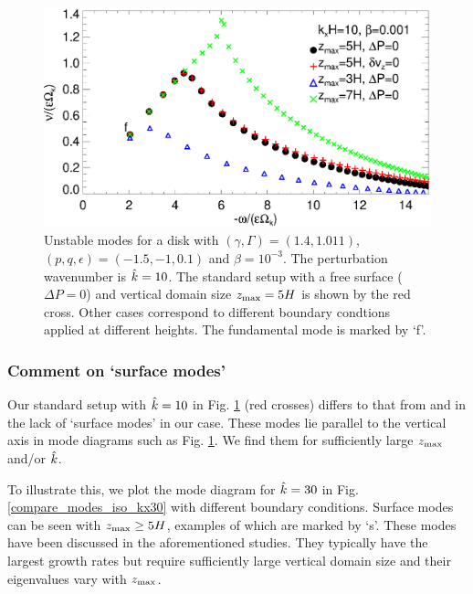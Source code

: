 \begin{figure}
  \includegraphics[width=\linewidth]{figures/compare_modes_iso_kx10.ps}
  \caption{Unstable modes for a disk with 
    $(\gamma,\Gamma)=(1.4,1.011)$, $(p,q,\epsilon)=(-1.5,-1,0.1)$ and
    $\beta=10^{-3}$. The perturbation wavenumber is $\hat{k}=10$. 
    The standard setup with a free surface ($\Delta P=0$) and 
    vertical domain size $z_\mathrm{max}=5H$ is shown by the red cross. Other
    cases correspond to different boundary condtions applied at
    different heights. The fundamental mode is marked by `f'.   
    \label{compare_modes_iso_kx10} 
  }
\end{figure}

\subsubsection{Comment on `surface modes'} 
Our standard setup with $\hat{k}=10$ in 
Fig. \ref{compare_modes_iso_kx10} (red crosses) differs to that from
\cite{nelson13} and \cite{mcnally14} in the lack of `surface modes' in
our case. These modes lie parallel to the vertical axis in mode
diagrams such as Fig. \ref{compare_modes_iso_kx10}. We find them for 
sufficiently large $z_\mathrm{max}$ and/or $\hat{k}$. %

To illustrate this, we plot the mode diagram for $\hat{k}=30$ in  
Fig. \ref{compare_modes_iso_kx30} with different boundary 
conditions. Surface modes can be seen with
$z_\mathrm{max}\geq 5H$, examples of which are marked by `s'. These modes have
been discussed in the aforementioned studies. They typically have the
largest growth rates but require sufficiently large vertical domain
size and their eigenvalues vary with $z_\mathrm{max}$. 

